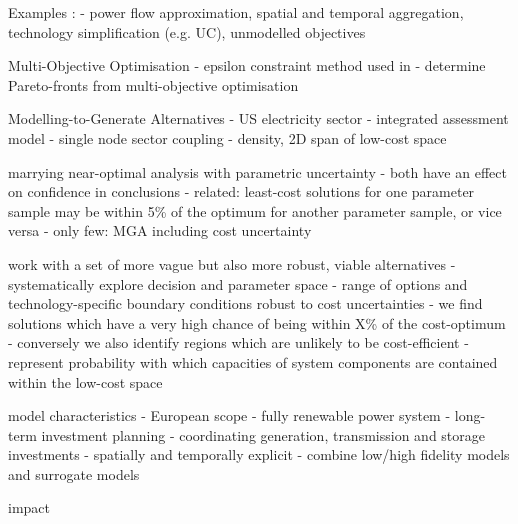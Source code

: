 
Examples \cite{DeCarolis2017}:
- power flow approximation, spatial and temporal aggregation, technology simplification (e.g. UC), unmodelled objectives

Multi-Objective Optimisation
- epsilon constraint method used in \cite{nearoptimal}
- determine Pareto-fronts from multi-objective optimisation \cite{mavrotas_effective_2009}

Modelling-to-Generate Alternatives
- \cite{DeCarolis2016} US electricity sector
- \cite{Price2017} integrated assessment model
- \cite{nacken_integrated_2019} single node sector coupling
- \cite{pedersen_modeling_2020} density, 2D span of low-cost space


marrying near-optimal analysis with parametric uncertainty
- both have an effect on confidence in conclusions
- related: least-cost solutions for one parameter sample may be within 5\% of the optimum for another parameter sample, or vice versa
- only few: MGA including cost uncertainty \cite{Trutnevyte2013,Li2017,lombardi_policy_2020}


work with a set of more vague but also more robust, viable alternatives
- systematically explore decision and parameter space
- range of options and technology-specific boundary conditions robust to cost uncertainties
- we find solutions which have a very high chance of being within X\% of the cost-optimum
- conversely we also identify regions which are unlikely to be cost-efficient
- represent probability with which capacities of system components are contained within the low-cost space

model characteristics
- European scope
- fully renewable power system
- long-term investment planning
- coordinating generation, transmission and storage investments
- spatially and temporally explicit
- combine low/high fidelity models and surrogate models

impact